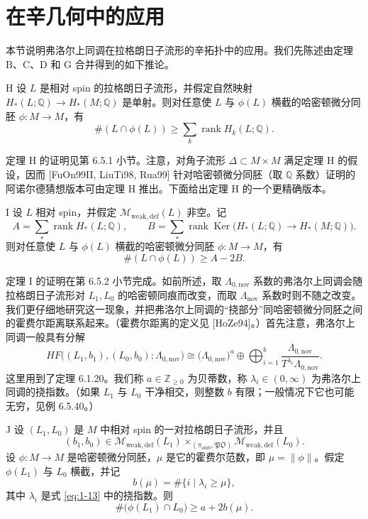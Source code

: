 
\section{在辛几何中的应用}
\label{sec:1-3}

本节说明弗洛尔上同调在拉格朗日子流形的辛拓扑中的应用。我们先陈述由定理 B、C、D 和 G 合并得到的如下推论。

\begin{theorem}{H}
设 $L$ 是相对 spin 的拉格朗日子流形，并假定自然映射
$H_*(L;\mathbb Q)\to H_*(M;\mathbb Q)$ 是单射。则对任意使
$L$ 与 $\phi(L)$ 横截的哈密顿微分同胚 $\phi:M\to M$，有
\[
  \#(L\cap\phi(L))\geq \sum_k\operatorname{rank}H_k(L;\mathbb Q).
\]
\end{theorem}

定理 H 的证明见第 6.5.1 小节。注意，对角子流形 $\Delta\subset M\times M$ 满足定理 H 的假设，因而 [FuOn99II, LiuTi98, Rua99] 针对哈密顿微分同胚（取 $\mathbb Q$ 系数）证明的阿诺尔德猜想版本可由定理 H 推出。下面给出定理 H 的一个更精确版本。

\begin{theorem}{I}
设 $L$ 相对 spin，并假定 $\mathcal M_{\mathrm{weak,def}}(L)$ 非空。记
\[
  A=\sum_*\operatorname{rank}H_*(L;\mathbb Q),\qquad
  B=\sum_*\operatorname{rank}\operatorname{Ker}
  \bigl(H_*(L;\mathbb Q)\to H_*(M;\mathbb Q)\bigr).
\]
则对任意使 $L$ 与 $\phi(L)$ 横截的哈密顿微分同胚
$\phi:M\to M$，有
\[
  \#(L\cap\phi(L))\geq A-2B.
\]
\end{theorem}

定理 I 的证明在第 6.5.2 小节完成。如前所述，取
$\Lambda_{0,\mathrm{nov}}$ 系数的弗洛尔上同调会随拉格朗日子流形对
$L_1,L_0$ 的哈密顿同痕而改变，而取 $\Lambda_{\mathrm{nov}}$ 系数时则不随之改变。我们更仔细地研究这一现象，并把弗洛尔上同调的“挠部分”同哈密顿微分同胚之间的霍费尔距离联系起来。（霍费尔距离的定义见 [HoZe94]。）首先注意，弗洛尔上同调一般具有分解
\begin{equation}
  HF\bigl((L_1,b_1),(L_0,b_0);\Lambda_{0,\mathrm{nov}}\bigr)
  \cong
  \bigl(\Lambda_{0,\mathrm{nov}}\bigr)^a
  \oplus
  \bigoplus_{i=1}^{b}
  \frac{\Lambda_{0,\mathrm{nov}}}
       {T^{\lambda_i}\Lambda_{0,\mathrm{nov}}}.
  \tag{1.13}\label{eq:1-13}
\end{equation}
这里用到了定理 6.1.20。我们称 $a\in\mathbb Z_{\geq0}$ 为贝蒂数，称
$\lambda_i\in(0,\infty)$ 为弗洛尔上同调的挠指数。（如果 $L_1$ 与
$L_0$ 干净相交，则整数 $b$ 有限；一般情况下它也可能无穷，见例 6.5.40。）

\begin{theorem}{J}
设 $(L_1,L_0)$ 是 $M$ 中相对 spin 的一对拉格朗日子流形，并且
\[
  (b_1,b_0)\in
  \mathcal M_{\mathrm{weak,def}}(L_1)
  \mathop{\times}_{(\pi_{\mathrm{amb}},\mathfrak{PO})}
  \mathcal M_{\mathrm{weak,def}}(L_0).
\]
设 $\phi:M\to M$ 是哈密顿微分同胚，$\mu$ 是它的霍费尔范数，即
$\mu=\lVert\phi\rVert$。假定 $\phi(L_1)$ 与 $L_0$ 横截，并记
\[
  b(\mu)=\#\{i\mid\lambda_i\geq\mu\},
\]
其中 $\lambda_i$ 是式 \eqref{eq:1-13} 中的挠指数。则
\[
  \#\bigl(\phi(L_1)\cap L_0\bigr)\geq a+2b(\mu).
\]
\end{theorem}


